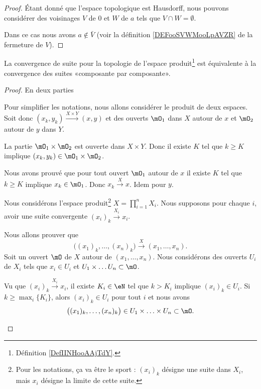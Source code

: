 \begin{proof}
	Étant donné que l'espace topologique est Hausdorff, nous pouvons considérer des voisinages \( V\) de \( 0\) et \( W\) de \( a\) tels que \( V\cap W=\emptyset\).

	Dans ce cas nous avons \( a\notin \bar V\) (voir la définition \ref{DEFooSVWMooLpAVZR} de la fermeture de \( V\)).
\end{proof}

\begin{proposition}      \label{PROPooNRRIooCPesgO}
	La convergence de suite pour la topologie de l'espace produit\footnote{Définition \ref{DefIINHooAAjTdY}.} est équivalente à la convergence des suites «composante par composante».
\end{proposition}

\begin{proof}
	En deux parties
	\begin{subproof}
		Pour simplifier les notations, nous allons considérer le produit de deux espaces. Soit donc \( (x_k,y_k)\stackrel{X\times Y}{\longrightarrow}(x,y)\) et des ouverts \( \mO_1\) dans \( X\) autour de \( x\) et \( \mO_2\) autour de \( y\) dans \( Y\).

		La partie \( \mO_1\times \mO_2\) est ouverte dans \( X\times Y\). Donc il existe \( K\) tel que \( k\geq K\) implique \( (x_k,y_k)\in \mO_1\times \mO_2\).

		Nous avons prouvé que pour tout ouvert \( \mO_1\) autour de \( x\) il existe \( K\) tel que \( k\geq K\) implique \( x_k\in \mO_1\). Donc \( x_k\stackrel{X}{\longrightarrow}x\). Idem pour \( y\).

		Nous considérons l'espace produit\footnote{Pour les notations, ça va être le sport : \( (x_i)_k\) désigne une suite dans \( X_i\), mais \( x_i\) désigne la limite de cette suite.} \( X=\prod_{i=1}^nX_i\). Nous supposons pour chaque \( i\), avoir une suite convergente \( (x_i)_k\stackrel{X_i}{\longrightarrow}x_i\).

		Nous allons prouver que
		\begin{equation}
			\big( (x_1)_k,\ldots, (x_n)_k \big)\stackrel{X}{\longrightarrow}(x_1,\ldots, x_n).
		\end{equation}
		Soit un ouvert \( \mO\) de \( X\) autour de \( (x_1,\ldots, x_n)\). Nous considérons des ouverts \( U_i\) de \( X_i\) tels que \( x_i\in U_i\) et \( U_1\times\ldots U_n\subset\mO\).

		Vu que \( (x_i)_k\stackrel{X_i}{\longrightarrow}x_i\), il existe \( K_i\in \eN\) tel que \( k>K_i\) implique \( (x_i)_k\in U_i\). Si \( k\geq \max_i\{ K_i \}\), alors \( (x_i)_k\in U_i\) pour tout \( i\) et nous avons
		\begin{equation}
			\big( (x_1)_k,\ldots,(x_n)_k \big)\in U_1\times\ldots\times U_n\subset \mO.
		\end{equation}
	\end{subproof}
\end{proof}

